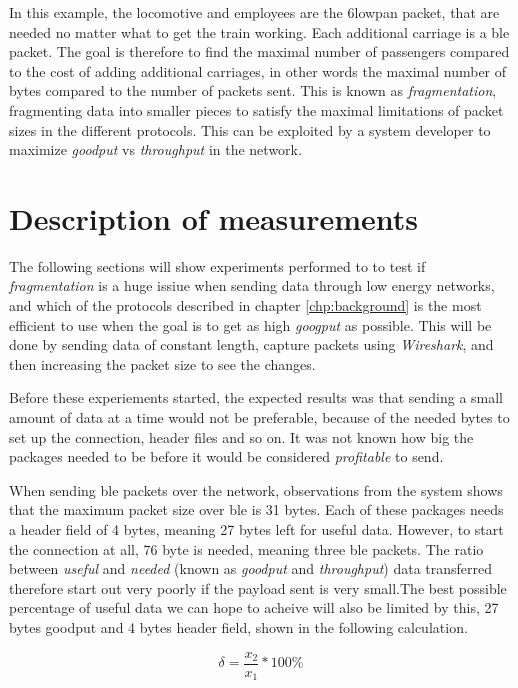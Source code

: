 In this example, the locomotive and employees are the \gls{6lowpan} packet, that are needed no matter what to get the train working. Each additional carriage is a \gls{ble} packet. The goal is therefore to find the maximal number of passengers compared to the cost of adding additional carriages, in other words the maximal number of bytes compared to the number of packets sent. This is known as \textit{fragmentation}, fragmenting data into smaller pieces to satisfy the maximal limitations of packet sizes in the different protocols. This can be exploited by a system developer to maximize \textit{goodput} vs \textit{throughput} in the network.
 


\section{Description of measurements}

The following sections will show experiments performed to to test if \textit{fragmentation} is a huge issiue when sending data through low energy networks, and which of the protocols described in chapter \ref{chp:background}  is the most efficient to use when the goal is to get as high \textit{googput} as possible. This will be done by sending data of constant length, capture packets using \textit{Wireshark}, and then increasing the packet size to see the changes. 

Before these experiements started, the expected results was that sending a small amount of data at a time would not be preferable, because of the needed bytes to set up the connection, header files and so on. It was not known how big the packages needed to be before it would be considered \textit{profitable} to send. 

When sending \gls{ble} packets over the network, observations from the system shows that the maximum packet size over \gls{ble} is 31 bytes. Each of these packages needs a header field of 4 bytes, meaning 27 bytes left for useful data. However, to start the connection at all, 76 byte is needed, meaning three \gls{ble} packets. The ratio between \textit{useful} and \textit{needed} (known as \textit{goodput} and \textit{throughput}) data transferred therefore start out very poorly if the payload sent is very small.The best possible percentage of useful data we can hope to acheive will also be limited by this, 27 bytes goodput and 4 bytes header field, shown in the following calculation.  

\begin{equation} \label{percentage_eq} 
	\delta = \frac{x_{2}}{x_{1}} * 100 \%
\end{equation}

